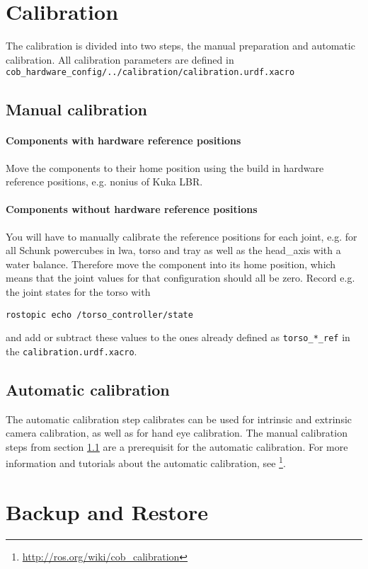 \section{Calibration}
The calibration is divided into two steps, the manual preparation and automatic calibration. All calibration parameters are defined in \texttt{cob\_hardware\_config/../calibration/calibration.urdf.xacro}

\subsection{Manual calibration}\label{sec:manual_calibration}

\paragraph{Components with hardware reference positions}
Move the components to their home position using the build in hardware reference positions, e.g. nonius of Kuka LBR.

\paragraph{Components without hardware reference positions}
You will have to manually calibrate the reference positions for each joint, e.g. for all Schunk powercubes in lwa, torso and tray as well as the head\_axis with a water balance. Therefore move the component into its home position, which means that the joint values for that configuration should all be zero. Record e.g. the joint states for the torso with
\begin{lstlisting}
rostopic echo /torso_controller/state
\end{lstlisting}
and add or subtract these values to the ones already defined as \texttt{torso\_*\_ref} in the \texttt{calibration.urdf.xacro}.

\subsection{Automatic calibration}
The automatic calibration step calibrates can be used for intrinsic and extrinsic camera calibration, as well as for hand eye calibration. The manual calibration steps from section \ref{sec:manual_calibration} are a prerequisit for the automatic calibration. For more information and tutorials about the automatic calibration, see \footnote{\url{http://ros.org/wiki/cob_calibration}}.

\section{Backup and Restore} 
